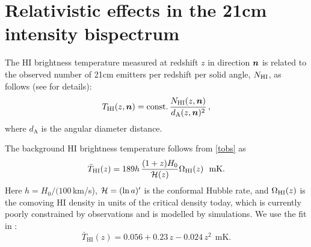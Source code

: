 \section{Relativistic effects in the 21cm intensity bispectrum}
%
{The HI brightness temperature  measured at redshift $z$ in direction $\bm {n}$  is related to the observed number of 21cm emitters per redshift per solid angle, $N_{{\mathrm{HI}}}$, as follows (see \cite{Hall:2012wd,Alonso:2015uua} for details):
\begin{equation}
T_{{\mathrm{HI}}}(z,\bm {n})= {\mathrm{const.}}\, \frac{ N_{{\mathrm{HI}}}(z,\bm {n})}{d_{\mathrm{A}}(z,\bm {n})^2}\,,
\label{tobs}
\end{equation}
where $d_{\mathrm{A}}$ is the angular diameter distance.  

{The background HI brightness temperature  follows from \eqref{tobs} as \cite{Villaescusa-Navarro:2018vsg}
\begin{equation} \label{bart}
\bar{T}_{\mathrm{HI}}(z)= 189h\,\frac{(1+z)H_0}{\mathcal{H}(z)}\Omega_{{\mathrm{HI}}}(z)~~{\mathrm{mK}}.
\end{equation}
Here $h=H_0/(100\,$km/s), $\mathcal{H}=(\ln a)'$ is the conformal Hubble rate, and $\Omega_{{\mathrm{HI}}}(z)$ is the comoving HI density in units of the critical density today, which is currently poorly constrained by observations and is modelled by simulations. We use the fit 
in  \cite{Santos:2017qgq}:
\begin{equation}
\bar{T}_{\mathrm{HI}}(z) = 0.0 56 +0.23\,z -0.024\, z^{2} ~~ \mathrm{mK}. \label{e1.24}
\end{equation}}

}

